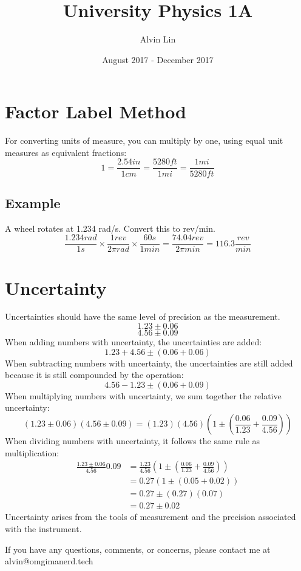\documentclass[letterpaper, 12pt]{math}
\title{University Physics 1A}
\author{Alvin Lin}
\date{August 2017 - December 2017}
\begin{document}
\maketitle

\section*{Factor Label Method}
For converting units of measure, you can multiply by one, using equal unit
measures as equivalent fractions:
\[ 1 = \frac{2.54in}{1cm} = \frac{5280ft}{1mi} = \frac{1mi}{5280ft} \]

\subsection*{Example}
A wheel rotates at 1.234 rad/s. Convert this to rev/min.
\[ \frac{1.234rad}{1s}\times\frac{1rev}{2\pi rad}\times\frac{60s}{1min} =
  \frac{74.04rev}{2\pi min} = 116.3\frac{rev}{min} \]

\section*{Uncertainty}
Uncertainties should have the same level of precision as the measurement.
\[ 1.23\pm0.06 \]
\[ 4.56\pm0.09 \]
When adding numbers with uncertainty, the uncertainties are added:
\[ 1.23+4.56\pm(0.06+0.06) \]
When subtracting numbers with uncertainty, the uncertainties are still
added because it is still compounded by the operation:
\[ 4.56-1.23\pm(0.06+0.09) \]
When multiplying numbers with uncertainty, we sum together the relative
uncertainty:
\[ (1.23\pm0.06)(4.56\pm0.09) =
  (1.23)(4.56)(1\pm(\frac{0.06}{1.23}+\frac{0.09}{4.56})) \]
When dividing numbers with uncertainty, it follows the same rule as
multiplication:
\begin{align*}
  \frac{1.23\pm0.06}{4.56}{0.09} &=
    \frac{1.23}{4.56}(1\pm(\frac{0.06}{1.23}+\frac{0.09}{4.56})) \\
  &= 0.27(1\pm(0.05+0.02)) \\
  &= 0.27\pm(0.27)(0.07) \\
  &= 0.27\pm0.02
\end{align*}
Uncertainty arises from the tools of measurement and the precision associated
with the instrument.

\begin{center}
  If you have any questions, comments, or concerns, please contact me at
  alvin@omgimanerd.tech
\end{center}
\end{document}
